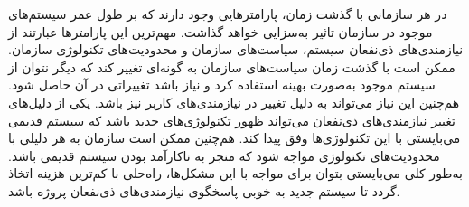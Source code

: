 
در هر سازمانی با گذشت زمان، پارامترهایی وجود دارند که بر طول عمر سیستم‌های موجود در سازمان تاثیر به‌سزایی خواهد گذاشت. مهم‌ترین این پارامترها عبارتند از نیازمندی‌های ذی‌نفعان سیستم، سیاست‌های سازمان و محدودیت‌های تکنولوژی سازمان. ممکن است با گذشت زمان سیاست‌های سازمان به گونه‌ای تغییر کند که دیگر نتوان از سیستم موجود به‌صورت بهینه استفاده کرد و نیاز باشد تغییراتی در آن حاصل شود. هم‌چنین این نیاز می‌تواند به دلیل تغییر در نیازمندی‌های کاربر نیز باشد. یکی از دلیل‌های تغییر نیازمندی‌های ذی‌نفعان می‌تواند ظهور تکنولوژی‌‌های جدید باشد که سیستم قدیمی می‌بایستی با این تکنولوژی‌ها وفق پیدا کند. هم‌چنین ممکن است سازمان به هر دلیلی با محدودیت‌های تکنولوژی مواجه شود که منجر به ناکارآمد بودن سیستم قدیمی باشد. به‌طور کلی می‌بایستی بتوان برای مواجه با این مشکل‌ها، راه‌حلی با کم‌ترین هزینه اتخاذ گردد تا سیستم جدید به خوبی پاسخگوی نیازمندی‌های ذی‌نفعان پروژه باشد.






